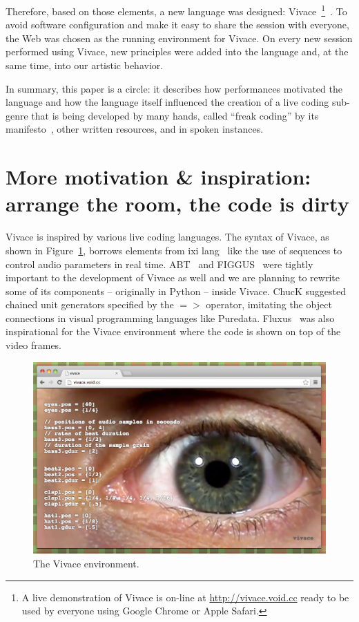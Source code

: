 \documentclass[letterpaper, 12pt]{article}
\begin{document}
Therefore, based on those elements, a new language was designed:
Vivace~\footnote{A live demonstration of Vivace is on-line at
  \url{http://vivace.void.cc} ready to be used by everyone using
  Google Chrome or Apple Safari.}~\citep{Vivace}.  To avoid software
configuration and make it easy to share the session with everyone, the
Web was chosen as the running environment for Vivace. On every new
session performed using Vivace, new principles were added into the
language and, at the same time, into our artistic behavior.

In summary, this paper is a circle: it describes how performances
motivated the language and how the language itself influenced the
creation of a live coding sub-genre that is being developed by many
hands, called ``freak coding'' by its manifesto~\citep{freak}, other
written resources, and in spoken instances.

\parskip 18pt

\section{More motivation \& inspiration: arrange the room, the code is dirty}

Vivace is inspired by various live coding languages. The syntax of
Vivace, as shown in Figure~\ref{fig:vivace}, borrows elements from ixi
lang~\citep{magnusson2011ixi} like the use of sequences to control
audio parameters in real time. ABT~\citep{fabbri} and
FIGGUS~\citep{fabbri2} were tightly important to the development of
Vivace as well and we are planning to rewrite some of its components
-- originally in Python -- inside Vivace. ChucK suggested chained unit
generators specified by the $=>$ operator, imitating the object
connections in visual programming languages like
Puredata. Fluxus~\citep{fluxus} was also inspirational for the Vivace
environment where the code is shown on top of the video frames.

\begin{figure}[htpb]
  \begin{center}
    \includegraphics[scale=.3]{img/fig_vivace.png}
    \caption{The Vivace environment.}
    \label{fig:vivace}
  \end{center}
\end{figure}
\end{document}
